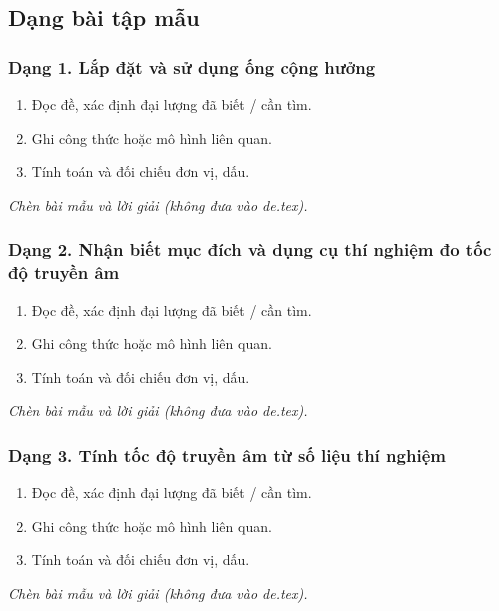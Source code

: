 

\subsection{Dạng bài tập mẫu}
\subsubsection{Dạng 1. Lắp đặt và sử dụng ống cộng hưởng}
\begin{phuongphap}
\begin{enumerate}
\item Đọc đề, xác định đại lượng đã biết / cần tìm.
\item Ghi công thức hoặc mô hình liên quan.
\item Tính toán và đối chiếu đơn vị, dấu.
\end{enumerate}
\end{phuongphap}
\begin{vidumau}
\textit{Chèn bài mẫu và lời giải (không đưa vào de.tex).}
\end{vidumau}

\subsubsection{Dạng 2. Nhận biết mục đích và dụng cụ thí nghiệm đo tốc độ truyền âm}
\begin{phuongphap}
\begin{enumerate}
\item Đọc đề, xác định đại lượng đã biết / cần tìm.
\item Ghi công thức hoặc mô hình liên quan.
\item Tính toán và đối chiếu đơn vị, dấu.
\end{enumerate}
\end{phuongphap}
\begin{vidumau}
\textit{Chèn bài mẫu và lời giải (không đưa vào de.tex).}
\end{vidumau}

\subsubsection{Dạng 3. Tính tốc độ truyền âm từ số liệu thí nghiệm}
\begin{phuongphap}
\begin{enumerate}
\item Đọc đề, xác định đại lượng đã biết / cần tìm.
\item Ghi công thức hoặc mô hình liên quan.
\item Tính toán và đối chiếu đơn vị, dấu.
\end{enumerate}
\end{phuongphap}
\begin{vidumau}
\textit{Chèn bài mẫu và lời giải (không đưa vào de.tex).}
\end{vidumau}

